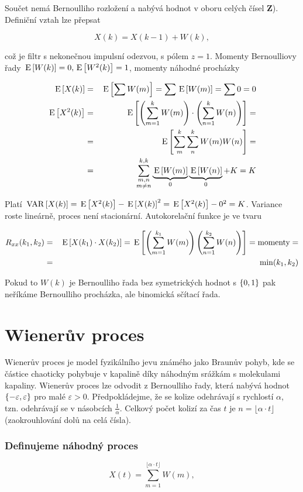Součet nemá Bernoulliho rozložení a nabývá hodnot v oboru celých čísel \textbf{Z}). Definiční vztah lze přepsat

\[ X(k) =X(k-1)+W(k), \]

což je filtr s nekonečnou impulsní odezvou, s pólem $z=1$. Momenty Bernoulliovy řady $\,\mathrm{E}\left[W(k)\right]=0,\,\mathrm{E}\left[W^2(k)\right]=1$, momenty náhodné procházky

\begin{eqnarray*}
\,\mathrm{E}\left[X(k)\right] & = & \,\mathrm{E}\left[\sum W(m)\right] =  \sum \,\mathrm{E}\left[W(m)\right] = \sum 0 = 0\\
\,\mathrm{E}\left[X^2(k)\right] & = & \,\mathrm{E}\left[\left(\sum_{m=1}^k W(m)\right)\cdot\left(\sum_{n=1}^k W(n)\right)\right]=\\
& = & \,\mathrm{E}\left[\sum_m^k\sum_n^k W(m)W(n)\right]=\\
& = & \sum^{k,k}_{\substack{m,n\\m\neq n}}\underbrace{\,\mathrm{E}\left[W(m)\right]}_0 \underbrace{\,\mathrm{E}\left[W(n)\right]}_0+K = K
\end{eqnarray*}

Platí $\,\mathrm{VAR}\left[X(k)\right]= \,\mathrm{E}\left[X^2(k)\right] - \,\mathrm{E}\left[X(k)\right]^2 = \,\mathrm{E}\left[X^2(k)\right] - 0^2 =  K$. Variance roste lineárně, proces není stacionární. Autokorelační funkce je ve tvaru

\begin{eqnarray*}
R_{xx}(k_1,k_2) &=& \,\mathrm{E}\left[X(k_1)\cdot X(k_2)\right]=\,\mathrm{E}\left[\left(\sum_{m=1}^{k_1}W(m)\right)\left(\sum_{n=1}^{k_2}W(n)\right)\right]=\text{momenty}=\\
& = & \min(k_1,k_2)
\end{eqnarray*}

Pokud to $W(k)$ je Bernoulliho řada bez symetrických hodnot s $ \left\{0,1\right\} $ pak neříkáme Bernoulliho procházka, ale binomická sčítací řada.

\section{Wienerův proces}
Wienerův proces je model fyzikálního jevu známého jako Braunův pohyb, kde se částice chaoticky pohybuje v kapalině díky náhodným srážkám s molekulami kapaliny. Wienerův proces lze odvodit z Bernoulliho řady, která nabývá hodnot $\left\{-\varepsilon,\varepsilon\right\}$ pro malé $\varepsilon>0$. Předpokládejme, že se kolize odehrávají s rychlostí $\alpha$, tzn. odehrávají se v násobcích $\frac{1}{\alpha}$. Celkový počet kolizí za čas $t$ je $n=\lfloor\alpha\cdot t\rfloor$ (zaokrouhlování dolů na celá čísla).

\subsubsection*{Definujeme náhodný proces}
\[ X(t)=\sum_{m=1}^{\lfloor\alpha\cdot t\rfloor} W(m), \]


